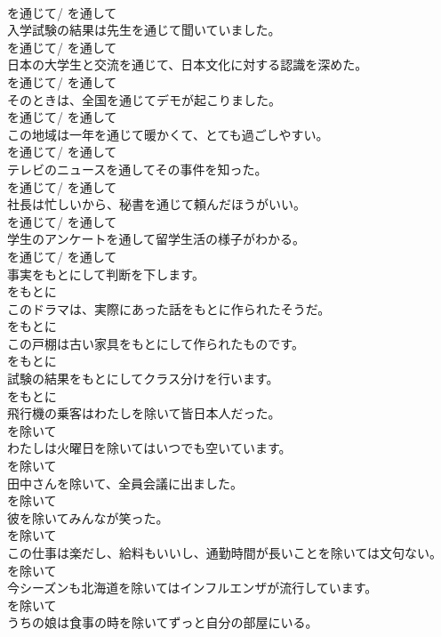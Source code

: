 \documentclass[8pt]{extreport}
\begin{document}
\begin{CJK}{UTF8}{min}
\\	を通じて/ を通して	
\\	入学試験の結果は先生を通じて聞いていました。	
\\	を通じて/ を通して	
\\	日本の大学生と交流を通じて、日本文化に対する認識を深めた。	
\\	を通じて/ を通して	
\\	そのときは、全国を通じてデモが起こりました。	
\\	を通じて/ を通して	
\\	この地域は一年を通じて暖かくて、とても過ごしやすい。	
\\	を通じて/ を通して	
\\	テレビのニュースを通してその事件を知った。	
\\	を通じて/ を通して	
\\	社長は忙しいから、秘書を通じて頼んだほうがいい。	
\\	を通じて/ を通して	
\\	学生のアンケートを通して留学生活の様子がわかる。	
\\	を通じて/ を通して	
\\	事実をもとにして判断を下します。	
\\	をもとに	
\\	このドラマは、実際にあった話をもとに作られたそうだ。	
\\	をもとに	
\\	この戸棚は古い家具をもとにして作られたものです。	
\\	をもとに	
\\	試験の結果をもとにしてクラス分けを行います。	
\\	をもとに	
\\	飛行機の乗客はわたしを除いて皆日本人だった。	
\\	を除いて	
\\	わたしは火曜日を除いてはいつでも空いています。	
\\	を除いて	
\\	田中さんを除いて、全員会議に出ました。	
\\	を除いて	
\\	彼を除いてみんなが笑った。	
\\	を除いて	
\\	この仕事は楽だし、給料もいいし、通勤時間が長いことを除いては文句ない。	
\\	を除いて	
\\	今シーズンも北海道を除いてはインフルエンザが流行しています。	
\\	を除いて	
\\	うちの娘は食事の時を除いてずっと自分の部屋にいる。	

\end{CJK}
\end{document}
